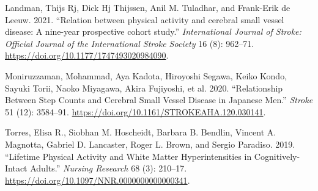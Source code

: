 \documentclass[
  letterpaper,
  DIV=11,
  numbers=noendperiod]{scrartcl}
\newlength{\cslhangindent}
\newenvironment{CSLReferences}[2] %
 {\begin{list}{}{%
  \setlength{\itemindent}{0pt}
  \setlength{\leftmargin}{0pt}
  \setlength{\parsep}{0pt}
  \ifodd #1
   \setlength{\leftmargin}{\cslhangindent}
   \setlength{\itemindent}{-1\cslhangindent}
  \fi
  \setlength{\itemsep}{#2\baselineskip}}}
 {\end{list}}
\begin{document}
\label{refs}
\begin{CSLReferences}{1}{0}
Landman, Thijs Rj, Dick Hj Thijssen, Anil M. Tuladhar, and Frank-Erik de
Leeuw. 2021. {``Relation between physical activity and cerebral small
vessel disease: A nine-year prospective cohort study.''}
\emph{International Journal of Stroke: Official Journal of the
International Stroke Society} 16 (8): 962--71.
\url{https://doi.org/10.1177/1747493020984090}.

Moniruzzaman, Mohammad, Aya Kadota, Hiroyoshi Segawa, Keiko Kondo,
Sayuki Torii, Naoko Miyagawa, Akira Fujiyoshi, et al. 2020.
{``Relationship Between Step Counts and Cerebral Small Vessel Disease in
Japanese Men.''} \emph{Stroke} 51 (12): 3584--91.
\url{https://doi.org/10.1161/STROKEAHA.120.030141}.

Torres, Elisa R., Siobhan M. Hoscheidt, Barbara B. Bendlin, Vincent A.
Magnotta, Gabriel D. Lancaster, Roger L. Brown, and Sergio Paradiso.
2019. {``Lifetime Physical Activity and White Matter Hyperintensities in
Cognitively-Intact Adults.''} \emph{Nursing Research} 68 (3): 210--17.
\url{https://doi.org/10.1097/NNR.0000000000000341}.

\end{CSLReferences}
\end{document}
